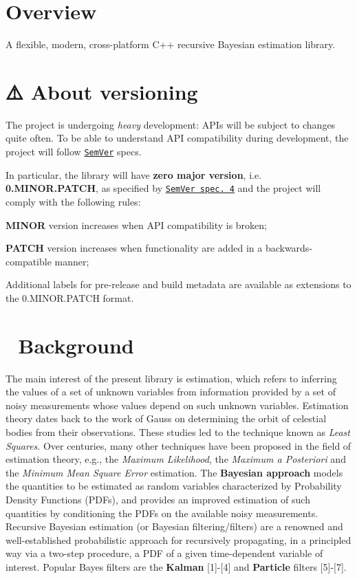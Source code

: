 \hypertarget{index_overview}{}\section{Overview}\label{index_overview}
A flexible, modern, cross-\/platform C++ recursive Bayesian estimation library.\hypertarget{index_versioning}{}\section{⚠️ About versioning}\label{index_versioning}


 The project is undergoing {\itshape heavy} development\+: A\+P\+Is will be subject to changes quite often. To be able to understand A\+PI compatibility during development, the project will follow \href{http://semver.org/}{\tt Sem\+Ver} specs.

In particular, the library will have {\bfseries zero major version}, i.\+e. {\bfseries 0.\+M\+I\+N\+O\+R.\+P\+A\+T\+CH}, as specified by \href{http://semver.org/#spec-item-4}{\tt Sem\+Ver spec. 4} and the project will comply with the following rules\+:
\begin{DoxyEnumerate}
\item {\bfseries M\+I\+N\+OR} version increases when A\+PI compatibility is broken;
\item {\bfseries P\+A\+T\+CH} version increases when functionality are added in a backwards-\/compatible manner;
\item Additional labels for pre-\/release and build metadata are available as extensions to the 0.\+M\+I\+N\+O\+R.\+P\+A\+T\+CH format.
\end{DoxyEnumerate}\hypertarget{index_background}{}\section{📖 Background}\label{index_background}


 The main interest of the present library is estimation, which refers to inferring the values of a set of unknown variables from information provided by a set of noisy measurements whose values depend on such unknown variables. Estimation theory dates back to the work of Gauss on determining the orbit of celestial bodies from their observations. These studies led to the technique known as {\itshape Least Squares}. Over centuries, many other techniques have been proposed in the field of estimation theory, e.\+g., the {\itshape Maximum Likelihood}, the {\itshape Maximum a Posteriori} and the {\itshape Minimum Mean Square Error} estimation. The {\bfseries Bayesian approach} models the quantities to be estimated as random variables characterized by Probability Density Functions (P\+D\+Fs), and provides an improved estimation of such quantities by conditioning the P\+D\+Fs on the available noisy measurements. Recursive Bayesian estimation (or Bayesian filtering/filters) are a renowned and well-\/established probabilistic approach for recursively propagating, in a principled way via a two-\/step procedure, a P\+DF of a given time-\/dependent variable of interest. Popular Bayes filters are the {\bfseries Kalman} \mbox{[}1\mbox{]}-\/\mbox{[}4\mbox{]} and {\bfseries Particle} filters \mbox{[}5\mbox{]}-\/\mbox{[}7\mbox{]}.

